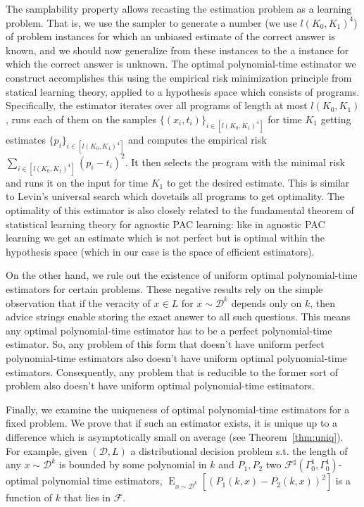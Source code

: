 \documentclass{article}
\numberwithin{equation}{section}
\theoremstyle{definition}
\theoremstyle{plain}
\DeclareMathOperator{\E}{E}
\newcommand{\Dist}{\mathcal{D}}
\newcommand{\Fall}{\mathcal{F}}
\begin{document}
The samplability property allows recasting the estimation problem as a learning problem. That is, we use the sampler to generate a number (we use ${l(K_0,K_1)^4}$) of problem instances for which an unbiased estimate of the correct answer is known, and we should now generalize from these instances to the a instance for which the correct answer is unknown. The optimal polynomial-time estimator we construct accomplishes this using the empirical risk minimization principle from statical learning theory, applied to a hypothesis space which consists of programs. Specifically, the estimator iterates over all programs of length at most ${l(K_0,K_1)}$, runs each of them on the samples ${\{(x_i,t_i)\}_{i \in [l(K_0,K_1)^4]}}$ for time ${K_1}$ getting estimates ${\{p_i\}_{i \in [l(K_0,K_1)^4]}}$ and computes the empirical risk ${\sum_{i \in [l(K_0,K_1)^4]}(p_i-t_i)^2}$. It then selects the program with the minimal risk and runs it on the input for time ${K_1}$ to get the desired estimate. This is similar to Levin's universal search which dovetails all programs to get optimality. The optimality of this estimator is also closely related to the fundamental theorem of statistical learning theory for agnostic PAC learning\cite{Shalev-Shwartz_2014}: like in agnostic PAC learning we get an estimate which is not perfect but is optimal within the hypothesis space (which in our case is the space of efficient estimators).

On the other hand, we rule out the existence of uniform optimal polynomial-time estimators for certain problems. These negative results rely on the simple observation that if the veracity of ${x \in L}$ for ${x \sim \Dist^k}$ depends only on ${k}$, then advice strings enable storing the exact answer to all such questions. This means any optimal polynomial-time estimator has to be a perfect polynomial-time estimator. So, any problem of this form that doesn't have uniform perfect polynomial-time estimators also doesn't have uniform optimal polynomial-time estimators. Consequently, any problem that is reducible to the former sort of problem also doesn't have uniform optimal polynomial-time estimators.

Finally, we examine the uniqueness of optimal polynomial-time estimators for a fixed problem. We prove that if such an estimator exists, it is unique up to a difference which is asymptotically small on average (see Theorem~\ref{thm:uniq}). For example, given ${(\Dist,L)}$ a distributional decision problem s.t. the length of any ${x \sim \Dist^k}$ is bounded by some polynomial in ${k}$ and ${P_1,P_2}$ two ${\Fall^\sharp(\Gamma_0^1,\Gamma_0^1)}$-optimal polynomial time estimators, ${\E_{x \sim \Dist^k}[(P_1(k,x)-P_2(k,x))^2]}$ is a function of ${k}$ that lies in ${\Fall}$.
\end{document}

